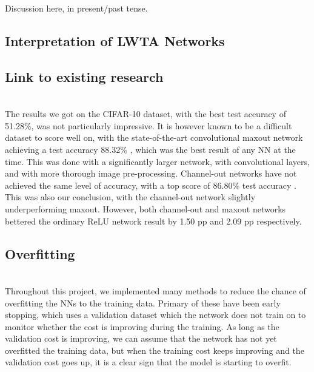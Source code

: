 Discussion here, in present/past tense.

\subsection{Interpretation of LWTA Networks}


\subsection{Link to existing research}
     \\
    The results we got on the CIFAR-10 dataset, with the best test accuracy of 51.28\%, was not particularly impressive. It is however known to be a difficult dataset to score well on, with the state-of-the-art convolutional maxout network achieving a test accuracy 88.32\% \citep{Maxout_Networks}, which was the best result of any NN at the time. This was done with a significantly larger network, with convolutional layers, and with more thorough image pre-processing. Channel-out networks have not achieved the same level of accuracy, with a top score of 86.80\% test accuracy \citep{Wang}. This was also our conclusion, with the channel-out network slightly underperforming maxout. However, both channel-out and maxout networks bettered the ordinary ReLU network result by 1.50 pp and 2.09 pp respectively.



\subsection{Overfitting}
     \\
    Throughout this project, we implemented many methods to reduce the chance of overfitting the NNs to the training data. Primary of these have been early stopping, which uses a validation dataset which the network does not train on to monitor whether the cost is improving during the training. As long as the validation cost is improving, we can assume that the network has not yet overfitted the training data, but when the training cost keeps improving and the validation cost goes up, it is a clear sign that the model is starting to overfit.

